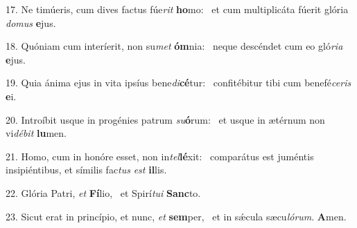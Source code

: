 17. Ne timúeris, cum dives factus fúe\textit{rit} \textbf{ho}mo: \ast\  et cum multiplicáta fúerit glória \textit{do}\textit{mus} \textbf{e}jus.\

18. Quóniam cum interíerit, non su\textit{met} \textbf{óm}nia: \ast\  neque descéndet cum eo gló\textit{ri}\textit{a} \textbf{e}jus.\

19. Quia ánima ejus in vita ipsíus bene\textit{di}\textbf{cé}tur: \ast\  confitébitur tibi cum benefé\textit{ce}\textit{ris} \textbf{e}i.\

20. Introíbit usque in progénies patrum \textit{su}\textbf{ó}rum: \ast\  et usque in ætérnum non vi\textit{dé}\textit{bit} \textbf{lu}men.\

21. Homo, cum in honóre esset, non in\textit{tel}\textbf{lé}xit: \ast\  comparátus est juméntis insipiéntibus, et símilis fac\textit{tus} \textit{est} \textbf{il}lis.\

22. Glória Patri, \textit{et} \textbf{Fí}lio, \ast\  et Spirí\textit{tu}\textit{i} \textbf{Sanc}to.\

23. Sicut erat in princípio, et nunc, \textit{et} \textbf{sem}per, \ast\  et in sǽcula sæcu\textit{ló}\textit{rum}. \textbf{A}men.\

